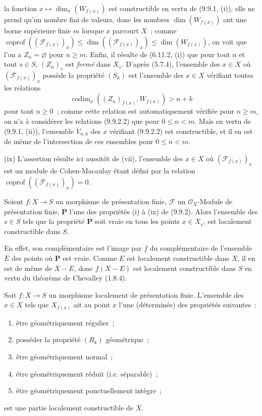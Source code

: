 
la fonction $x\mapsto\dim_x(W_{f(x)})$ est constructible en vertu de
(9.9.1, (i)), elle ne prend qu'un nombre fini de valeurs, donc les nombres
$\dim(W_{f(x)})$ ont une borne supérieure finie $m$ lorsque $x$ parcourt $X$~;
comme
$\operatorname{coprof}((\mathcal F_{f(x)})_x)\leq
\dim((\mathcal F_{f(x)})_x)\leq\dim(W_{f(x)})$, on voit que l'on a
$Z_n=\varnothing$ pour $n\geq m$. Enfin, il résulte de (6.11.2, (i)) que pour
tout $n$ et tout $s\in S$, $(Z_n)_s$ est \emph{fermé} dans $X_s$. D'après
(5.7.4), l'ensemble des $x\in X$ où $(\mathcal F_{f(x)})_x$ possède la
propriété $(S_k)$ est l'ensemble des $x\in X$ vérifiant toutes les relations
\begin{equation}
\tag{9.9.2.2}
\label{IV.9.9.2.2-fr}
\operatorname{codim}_x((Z_n)_{f(x)},W_{f(x)})>n+k
\end{equation}
pour tout $n\geq0$~; comme cette relation est automatiquement vérifiée pour
$n\geq m$, on n'a à considérer les relations (9.9.2.2) que pour $0\leq n<m$.
Mais en vertu de (9.9.1, (ii)), l'ensemble $V_{n,k}$ des $x$ vérifiant (9.9.2.2)
est constructible, et il en est de même de l'intersection de ces ensembles pour
$0\leq n<m$.

(ix) L'assertion résulte ici aussitôt de (vii), l'ensemble des $x\in X$ où
$(\mathcal F_{f(x)})_x$ est un module de Cohen-Macaulay étant défini par la
relation $\operatorname{coprof}((\mathcal F_{f(x)})_x)=0$.

\begin{corollary}[9.9.3]
\label{IV.9.9.3-fr}
Soient $f:X\to S$ un morphisme de présentation finie, $\mathcal F$ un
$\mathcal O_X$-Module de présentation finie, $\mathbf P$ l'une des propriétés
(i) à (ix) de (9.9.2). Alors l'ensemble des $s\in S$ tels que la propriété
$\mathbf P$ soit vraie en tous les points $x\in X_s$, est localement
constructible dans $S$.
\end{corollary}

En effet, son complémentaire est l'image par $f$ du complémentaire de
l'ensemble $E$ des points où $\mathbf P$ est vraie. Comme $E$ est localement
constructible dans $X$, il en est de même de $X-E$, donc $f(X-E)$ est
localement constructible dans $S$ en vertu du théorème de Chevalley (1.8.4).

\begin{proposition}[9.9.4]
\label{IV.9.9.4-fr}
Soit $f:X\to S$ un morphisme localement de présentation finie. L'ensemble des
$x\in X$ tels que $X_{f(x)}$ ait au point $x$ l'une (déterminée) des propriétés
suivantes~:
\begin{enumerate}
\item[(i)] être géométriquement régulier~;
\item[(ii)] posséder la propriété $(R_k)$ géométrique~;
\item[(iii)] être géométriquement normal~;
\item[(iv)] être géométriquement réduit (i.e. séparable)~;
\item[(v)] être géométriquement ponctuellement intègre~;
\end{enumerate}
est une partie localement constructible de $X$.
\end{proposition}

